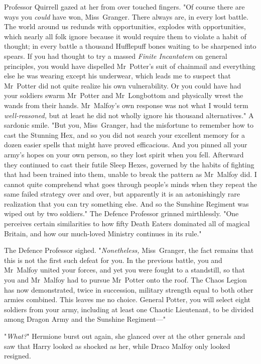 Professor Quirrell gazed at her from over touched fingers. "Of course there are
ways you \emph{could} have won, Miss~Granger. There always are, in every lost
battle. The world around us redunds with opportunities, explodes with
opportunities, which nearly all folk ignore because it would require them to
violate a habit of thought; in every battle a thousand Hufflepuff bones waiting
to be sharpened into spears. If you had thought to try a massed \emph{Finite
Incantatem} on general principles, you would have dispelled Mr~Potter's suit
of chainmail and everything else he was wearing except his underwear, which
leads me to suspect that Mr~Potter did not quite realize his own
vulnerability. Or you could have had your soldiers swarm Mr~Potter and
Mr~Longbottom and physically wrest the wands from their hands. Mr~Malfoy's
own response was not what I would term \emph{well-reasoned,} but at least he
did not wholly ignore his thousand alternatives." A sardonic smile. "But you,
Miss~Granger, had the misfortune to remember how to cast the Stunning Hex, and
so you did not search your excellent memory for a dozen easier spells that
might have proved efficacious. And you pinned all your army's hopes on your own
person, so they lost spirit when you fell. Afterward they continued to cast
their futile Sleep Hexes, governed by the habits of fighting that had been
trained into them, unable to break the pattern as Mr~Malfoy did. I cannot
quite comprehend what goes through people's minds when they repeat the same
failed strategy over and over, but apparently it is an astonishingly rare
realization that you can try something else. And so the Sunshine Regiment was
wiped out by two soldiers." The Defence Professor grinned mirthlessly. "One
perceives certain similarities to how fifty Death Eaters dominated all of
magical Britain, and how our much-loved Ministry continues in its rule."

The Defence Professor sighed. "\emph{Nonetheless,} Miss~Granger, the fact
remains that this is not the first such defeat for you. In the previous battle,
you and Mr~Malfoy united your forces, and yet you were fought to a standstill,
so that you and Mr~Malfoy had to pursue Mr~Potter onto the roof. The Chaos
Legion has now demonstrated, twice in succession, military strength equal to
both other armies combined. This leaves me no choice. General Potter, you will
select eight soldiers from your army, including at least one Chaotic
Lieutenant, to be divided among Dragon Army and the Sunshine Regiment---"

"\emph{What?}" Hermione burst out again, she glanced over at the other generals
and saw that Harry looked as shocked as her, while Draco Malfoy only looked
resigned.

